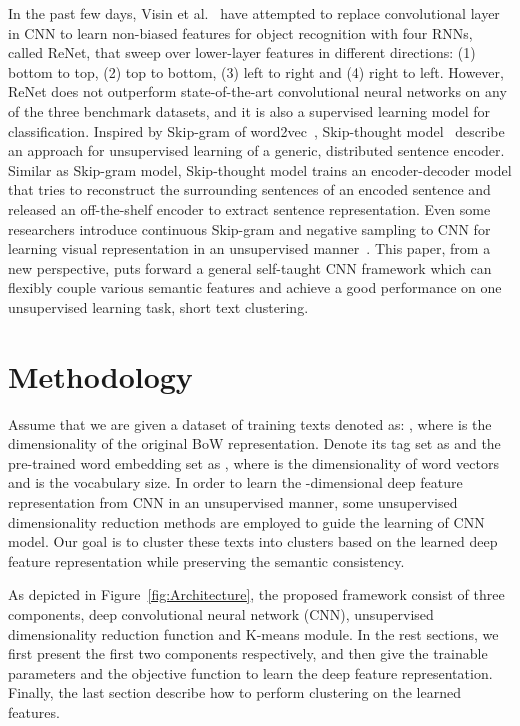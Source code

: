 \documentclass[review]{elsarticle}
\begin{document}
In the past few days, Visin et al.~\cite{visin2015renet} have attempted to replace convolutional layer in CNN to learn non-biased features for object recognition with four RNNs, called ReNet, that sweep over lower-layer features in different directions: (1) bottom to top, (2) top to bottom, (3) left to right and (4) right to left. However, ReNet does not outperform state-of-the-art convolutional neural networks on any of the three benchmark datasets, and it is also a supervised learning model for classification. Inspired by Skip-gram of word2vec~\cite{mikolov2013efficient,21_mikolov2013distributed}, Skip-thought model~\cite{kiros2015skip} describe an approach for unsupervised learning of a generic, distributed sentence encoder. Similar as Skip-gram model, Skip-thought model trains an encoder-decoder model that tries to reconstruct the surrounding sentences of an encoded sentence and released an off-the-shelf encoder to extract sentence representation. Even some researchers introduce continuous Skip-gram and negative sampling to CNN for learning visual representation in an unsupervised manner~\cite{wang2015unsupervised}.
This paper, from a new perspective, puts forward a general self-taught CNN framework which can flexibly couple various semantic features and achieve a good performance on one unsupervised learning task, short text clustering.




\section{Methodology}
\label{sec:Methodology}
  Assume that we are given a dataset of  training texts denoted as: , where  is the dimensionality of the original BoW representation. Denote its tag set as  and the pre-trained word embedding set as , where  is the dimensionality of word vectors and  is the vocabulary size. In order to learn the -dimensional deep feature representation  from CNN in an unsupervised manner, some unsupervised dimensionality reduction methods  are employed to guide the learning of CNN model. Our goal is to cluster these texts  into clusters  based on the learned deep feature representation while preserving the semantic consistency.

As depicted in Figure~\ref{fig:Architecture}, the proposed framework consist of three components, deep convolutional neural network (CNN), unsupervised dimensionality reduction function and K-means module. In the rest sections, we first present the first two components respectively, and then give the trainable parameters and the objective function to learn the deep feature representation. Finally, the last section describe how to perform clustering on the learned features.
\end{document}

